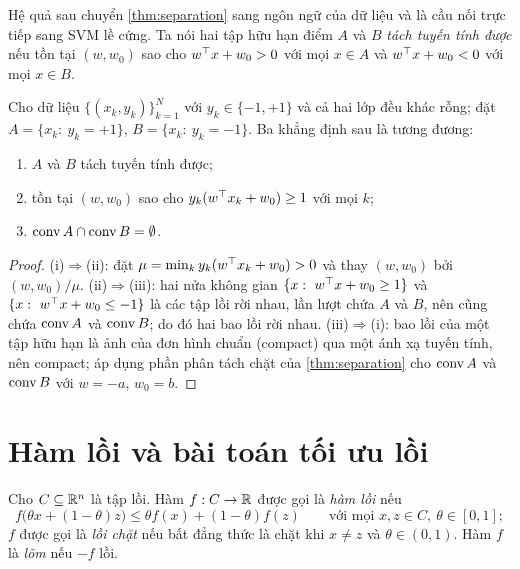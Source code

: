 Hệ quả sau chuyển \cref{thm:separation} sang ngôn ngữ của dữ liệu và là cầu nối trực tiếp sang SVM lề cứng. Ta nói hai tập hữu hạn điểm $A$ và $B$ \emph{tách tuyến tính được} nếu tồn tại $(w,w_0)$ sao cho $w^\top x+w_0>0$ với mọi $x\in A$ và $w^\top x+w_0<0$ với mọi $x\in B$.

\begin{corollary}\label{cor:separable}
Cho dữ liệu $\{(x_k,y_k)\}_{k=1}^N$ với $y_k\in\{-1,+1\}$ và cả hai lớp đều khác rỗng; đặt $A=\{x_k:\ y_k=+1\}$, $B=\{x_k:\ y_k=-1\}$. Ba khẳng định sau là tương đương:
\begin{enumerate}[label=(\roman*),leftmargin=2em]
\item $A$ và $B$ tách tuyến tính được;
\item tồn tại $(w,w_0)$ sao cho $y_k(w^\top x_k+w_0)\ge1$ với mọi $k$;
\item $\operatorname{conv} A\cap\operatorname{conv} B=\emptyset$.
\end{enumerate}
\end{corollary}

\begin{proof}
(i)$\Rightarrow$(ii): đặt $\mu=\min_k y_k(w^\top x_k+w_0)>0$ và thay $(w,w_0)$ bởi $(w,w_0)/\mu$. (ii)$\Rightarrow$(iii): hai nửa không gian $\{x:\ w^\top x+w_0\ge1\}$ và $\{x:\ w^\top x+w_0\le-1\}$ là các tập lồi rời nhau, lần lượt chứa $A$ và $B$, nên cũng chứa $\operatorname{conv} A$ và $\operatorname{conv} B$; do đó hai bao lồi rời nhau. (iii)$\Rightarrow$(i): bao lồi của một tập hữu hạn là ảnh của đơn hình chuẩn (compact) qua một ánh xạ tuyến tính, nên compact; áp dụng phần phân tách chặt của \cref{thm:separation} cho $\operatorname{conv} A$ và $\operatorname{conv} B$ với $w=-a$, $w_0=b$.
\end{proof}

\section{Hàm lồi và bài toán tối ưu lồi}\label{sec:convexopt}

\begin{definition}\label{def:convex-fn}
Cho $C\subseteq\mathbb{R}^n$ là tập lồi. Hàm $f:C\to\mathbb{R}$ được gọi là \emph{hàm lồi} nếu
\[
f\bigl(\theta x+(1-\theta)z\bigr)\le\theta f(x)+(1-\theta)f(z)\qquad\text{với mọi } x,z\in C,\ \theta\in[0,1];
\]
$f$ được gọi là \emph{lồi chặt} nếu bất đẳng thức là chặt khi $x\neq z$ và $\theta\in(0,1)$. Hàm $f$ là \emph{lõm} nếu $-f$ lồi.
\end{definition}

